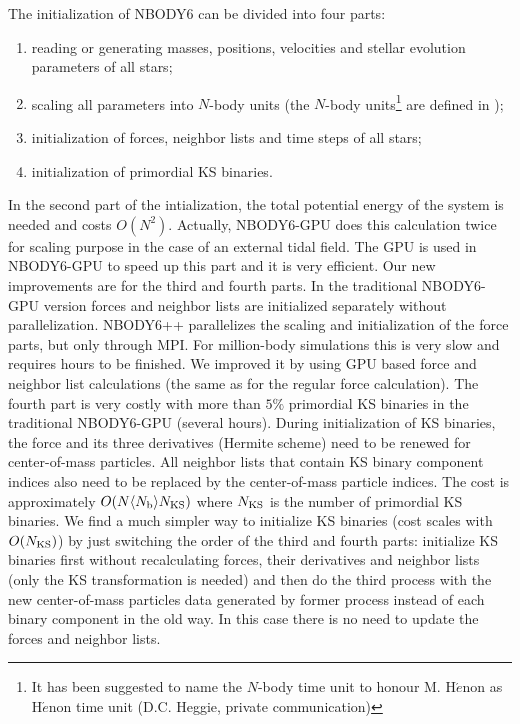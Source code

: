 \documentclass[usenatbib,aas_macros]{mn2e}
\def\nbody{NBODY6 }
\def\nbodygpu{NBODY6-GPU }
\def\nb{$N$-body }
\begin{document}
The initialization of \nbody can be divided into four parts:
\begin{enumerate}
\item reading or generating masses, positions, velocities and stellar evolution parameters of all stars;
\item scaling all parameters into \nb units (the \nb units\footnote{It has been suggested to name the \nb time unit to honour M. H$\acute{e}$non as H$\acute{e}$non time unit (D.C. Heggie, private communication)} are defined in \citealp{Heggie1986});
\item initialization of forces, neighbor lists and time steps of all stars;
\item initialization of primordial KS binaries.
\end{enumerate}
In the second part of the intialization, the total potential energy of the system is needed and costs $O(N^2)$. 
Actually, \nbodygpu does this calculation twice for scaling purpose in the case of an external tidal field.
The GPU is used in \nbodygpu to speed up this part and it is very efficient. 
Our new improvements are for the third and fourth parts. 
In the traditional \nbodygpu version forces and neighbor lists are initialized separately without parallelization. 
NBODY6++ parallelizes the scaling and initialization of the force parts, but only through MPI.
For million-body simulations this is very slow and requires hours to be finished.
We improved it by using GPU based force and neighbor list calculations (the same as for the regular force calculation). 
The fourth part is very costly with more than $5\%$ primordial KS binaries in the traditional \nbodygpu (several hours). 
During initialization of KS binaries, the force and its three derivatives (Hermite scheme) need to be renewed for center-of-mass particles. 
All neighbor lists that contain KS binary component indices also need to be replaced by the center-of-mass particle indices. 
The cost is approximately $O(N \langle N_{\rm b} \rangle N_{\rm KS})$ where $N_{\rm KS}$ is the number of primordial KS binaries. 
We find a much simpler way to initialize KS binaries (cost scales with $O(N_{\rm KS})$) by just switching the order of the third and fourth parts: 
initialize KS binaries first without recalculating forces, their derivatives and neighbor lists (only the KS transformation is needed) and then do the third process with the new center-of-mass particles data generated by former process instead of each binary component in the old way. 
In this case there is no need to update the forces and neighbor lists. 
\end{document}
